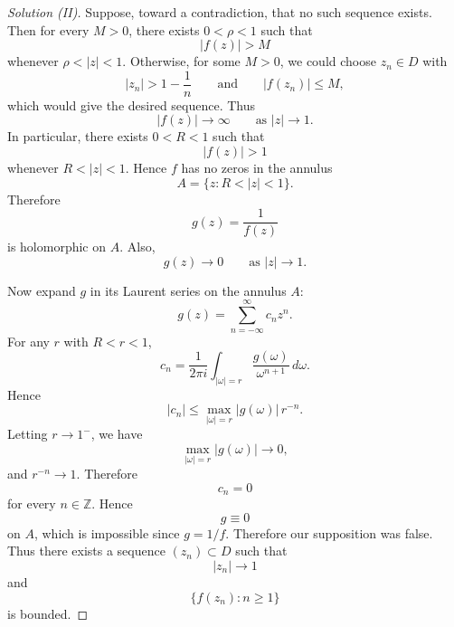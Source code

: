 \documentclass[12pt, a4paper]{report}
\theoremstyle{spaced}
\begin{document}
\begin{proof}[Solution (II)]
	Suppose, toward a contradiction, that no such sequence exists. Then for every
	\(M>0\), there exists \(0<\rho<1\) such that
	\[
		|f(z)|>M
	\]
	whenever \(\rho<|z|<1\). Otherwise, for some \(M>0\), we could choose
	\(z_n\in D\) with
	\[
		|z_n|>1-\frac1n
		\qquad\text{and}\qquad
		|f(z_n)|\le M,
	\]
	which would give the desired sequence.
	Thus
	\[
		|f(z)|\to \infty
		\qquad\text{as } |z|\to 1.
	\]
	In particular, there exists \(0<R<1\) such that
	\[
		|f(z)|>1
	\]
	whenever \(R<|z|<1\). Hence \(f\) has no zeros in the annulus
	\[
		A=\{z:R<|z|<1\}.
	\]
	Therefore
	\[
		g(z)=\frac1{f(z)}
	\]
	is holomorphic on \(A\). Also,
	\[
		g(z)\to 0
		\qquad\text{as } |z|\to 1.
	\]

	Now expand \(g\) in its Laurent series on the annulus \(A\):
	\[
		g(z)=\sum_{n=-\infty}^{\infty} c_n z^n.
	\]
	For any \(r\) with \(R<r<1\),
	\[
		c_n=\frac{1}{2\pi i}\int_{|\omega|=r}
		\frac{g(\omega)}{\omega^{n+1}}\,d\omega .
	\]
	Hence
	\[
		|c_n|
		\le \max_{|\omega|=r}|g(\omega)|\, r^{-n}.
	\]
	Letting \(r\to 1^{-}\), we have
	\[
		\max_{|\omega|=r}|g(\omega)|\to 0,
	\]
	and \(r^{-n}\to 1\). Therefore
	\[
		c_n=0
	\]
	for every \(n\in\mathbb Z\). Hence
	\[
		g\equiv 0
	\]
	on \(A\), which is impossible since \(g=1/f\).
	Therefore our supposition was false. Thus there exists a sequence
	\((z_n)\subset D\) such that
	\[
		|z_n|\to 1
	\]
	and
	\[
		\{f(z_n):n\ge 1\}
	\]
	is bounded.
\end{proof}
\end{document}

